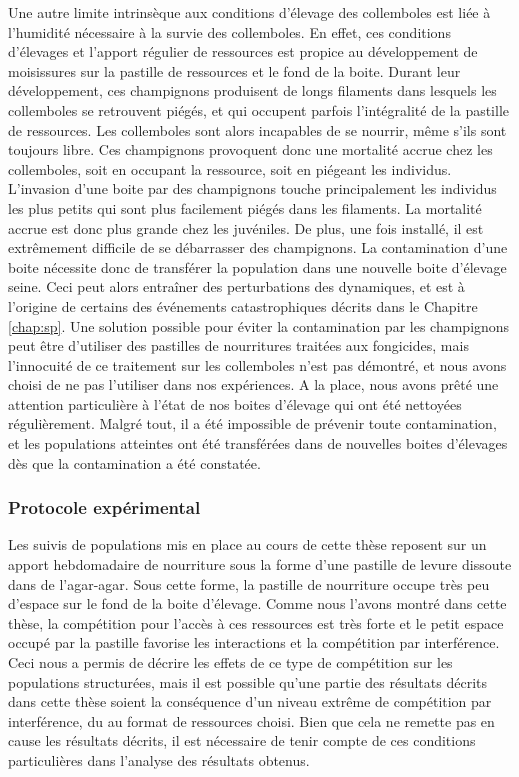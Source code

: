 Une autre limite intrinsèque aux conditions d'élevage des collemboles est liée à
l'humidité nécessaire à la survie des collemboles. En effet, ces conditions
d'élevages et l'apport régulier de ressources est propice au développement de
moisissures sur la pastille de ressources et le fond de la boite. Durant leur
développement, ces champignons produisent de longs filaments dans lesquels les
collemboles se retrouvent piégés, et qui occupent parfois l'intégralité de la
pastille de ressources. Les collemboles sont alors incapables de se nourrir,
même s'ils sont toujours libre. Ces champignons provoquent donc une mortalité
accrue chez les collemboles, soit en occupant la ressource, soit en piégeant les
individus. L'invasion d'une boite par des champignons touche principalement les
individus les plus petits qui sont plus facilement piégés dans les filaments. La
mortalité accrue est donc plus grande chez les juvéniles. De plus, une fois
installé, il est extrêmement difficile de se débarrasser des champignons. La
contamination d'une boite nécessite donc de transférer la population dans une
nouvelle boite d'élevage seine. Ceci peut alors entraîner des perturbations des
dynamiques, et est à l'origine de certains des événements catastrophiques
décrits dans le Chapitre \ref{chap:sp}. Une solution possible pour éviter la
contamination par les champignons peut être d'utiliser des pastilles de
nourritures traitées aux fongicides, mais l'innocuité de ce traitement sur les
collemboles n'est pas démontré, et nous avons choisi de ne pas l'utiliser dans
nos expériences. A la place, nous avons prêté une attention particulière à
l'état de nos boites d'élevage qui ont été nettoyées régulièrement. Malgré tout,
il a été impossible de prévenir toute contamination, et les populations
atteintes ont été transférées dans de nouvelles boites d'élevages dès que la
contamination a été constatée. 

\subsubsection{Protocole expérimental}

Les suivis de populations mis en place au cours de cette thèse reposent sur un
apport hebdomadaire de nourriture sous la forme d'une pastille de levure
dissoute dans de l'agar-agar. Sous cette forme, la pastille de nourriture occupe
très peu d'espace sur le fond de la boite d'élevage. Comme nous l'avons montré
dans cette thèse, la compétition pour l'accès à ces ressources est très forte et
le petit espace occupé par la pastille favorise les interactions et la
compétition par interférence. Ceci nous a permis de décrire les effets de ce
type de compétition sur les populations structurées, mais il est possible qu'une
partie des résultats décrits dans cette thèse soient la conséquence d'un niveau
extrême de compétition par interférence, du au format de ressources choisi. Bien
que cela ne remette pas en cause les résultats décrits, il est nécessaire de
tenir compte de ces conditions particulières dans l'analyse des résultats
obtenus. 

